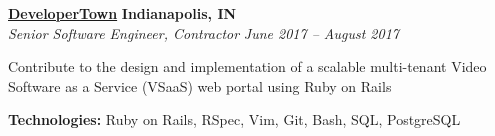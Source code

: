 %
    \headerrow
        {\textbf{\href{https://www.developertown.com/}{DeveloperTown}}}
        {\textbf{Indianapolis, IN}}
    \\
    \headerrow
        {\emph{Senior Software Engineer, Contractor}}
        {\emph{June 2017 -- August 2017}}
    \begin{itemize*}
        \item Contribute to the design and implementation of a scalable multi-tenant Video Software as a Service (VSaaS) web portal using Ruby on Rails
    \end{itemize*}

    \hspace{1.0em}
        {\textbf{Technologies:} Ruby on Rails, RSpec, Vim, Git, Bash, SQL, PostgreSQL}
